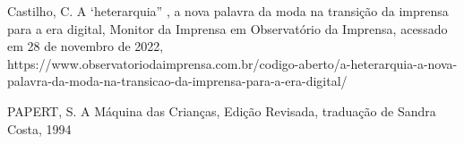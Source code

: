 \documentclass[
12pt,		%
openright,	%
twoside,  %
a4paper,			%
chapter=TITLE,		%
english,			%
french,				%
spanish,			%
brazil				%
]{USPSC-classe/USPSC}
\begin{document}
\begin{flushleft}
\begin{flushleft}
\begin{flushleft}
\begin{flushleft}
\begin{flushleft}
\begin{flushleft}
\begin{flushleft}
\begin{flushleft}
\begin{flushleft}
[CASTILHO, 2008] Castilho, C. A ‘heterarquia” , a nova palavra da moda na transi\c{c}\~ao da imprensa para a era digital, Monitor da Imprensa em Observat\'orio da Imprensa, acessado em 28 de novembro de 2022, https://www.observatoriodaimprensa.com.br/codigo-aberto/a-heterarquia-a-nova-palavra-da-moda-na-transicao-da-imprensa-para-a-era-digital/
\end{flushleft}


\end{flushleft}


\end{flushleft}


\end{flushleft}


\end{flushleft}


\end{flushleft}


\end{flushleft}


\end{flushleft}


\end{flushleft}


\begin{flushleft}
\begin{flushleft}
\begin{flushleft}
\begin{flushleft}
\begin{flushleft}
\begin{flushleft}
\begin{flushleft}
\begin{flushleft}
\begin{flushleft}
[PAPERT, 1994] PAPERT, S. A M\'aquina das Crian\c{c}as, Edi\c{c}\~ao Revisada, tradua\c{c}\~ao de Sandra Costa, 1994
\end{flushleft}


\end{flushleft}


\end{flushleft}


\end{flushleft}


\end{flushleft}


\end{flushleft}


\end{flushleft}


\end{flushleft}


\end{flushleft}
\end{document}
